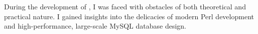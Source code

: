 During the development of \pname, I was faced with obstacles of both theoretical
and practical nature. I gained insights into the delicacies of modern Perl
development and high-performance, large-scale MySQL database design. 
